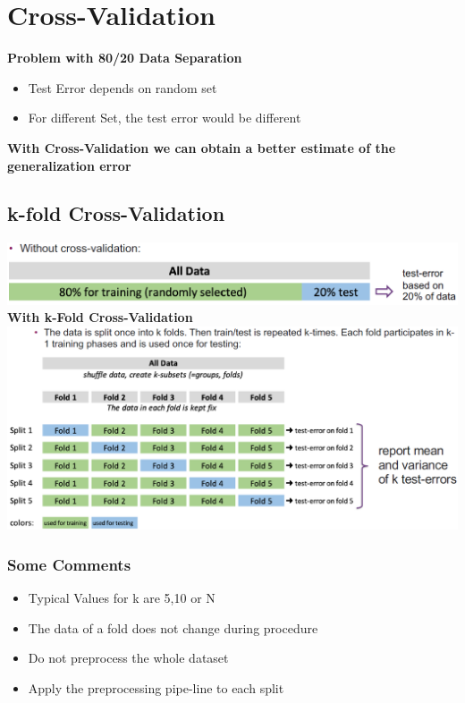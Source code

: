 \section{Cross-Validation}
\textbf{Problem with 80/20 Data Separation}
\begin{itemize}
    \item Test Error depends on random set
    \item For different Set, the test error would be different
\end{itemize}
\textbf{With Cross-Validation we can obtain a better estimate of the generalization error}

\columnbreak
\subsection{k-fold Cross-Validation}
\includegraphics[width=\linewidth]{./img/k_fold.png}
\textbf{With k-Fold Cross-Validation}\\
\includegraphics[width=\linewidth]{./img/k_fold2.png}

\subsubsection{Some Comments}
\begin{itemize}
    \item Typical Values for k are 5,10 or N
    \item The data of a fold does not change during procedure
    \item Do not preprocess the whole dataset
    \item Apply the preprocessing pipe-line to each split
\end{itemize}

